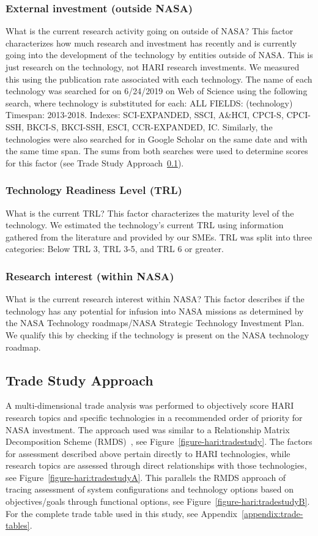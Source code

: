\subsubsection{External investment (outside NASA)}
What is the current research activity going on outside of NASA? This factor characterizes how much research and investment has recently and is currently going into the development of the technology by entities outside of NASA.
This is just research on the technology, not HARI research investments.
We measured this using the publication rate associated with each technology.
The name of each technology was searched for on 6/24/2019 on Web of Science using the following search, where technology is substituted for each:
ALL FIELDS: (technology)
Timespan: 2013-2018.
Indexes: SCI-EXPANDED, SSCI, A\&HCI, CPCI-S, CPCI-SSH, BKCI-S, BKCI-SSH, ESCI, CCR-EXPANDED, IC.
Similarly, the technologies were also searched for in Google Scholar on the same date and with the same time span.
The sums from both searches were used to determine scores for this factor (see Trade Study Approach~\ref{ss:tsapproach}).

\subsubsection{Technology Readiness Level (TRL)}
What is the current TRL? This factor characterizes the maturity level of the technology.
We estimated the technology's current TRL using information gathered from the literature and provided by our SMEs.
TRL was split into three categories: Below TRL 3, TRL 3-5, and TRL 6 or greater.

\subsubsection{Research interest (within NASA)}
What is the current research interest within NASA? This factor describes if the technology has any potential for infusion into NASA missions as determined by the NASA Technology roadmaps/NASA Strategic Technology Investment Plan.
We qualify this by checking if the technology is present on the NASA technology roadmap.

\subsection{Trade Study Approach} \label{ss:tsapproach}
A multi-dimensional trade analysis was performed to objectively score HARI research topics and specific technologies in a recommended order of priority for NASA investment.
The approach used was similar to a Relationship Matrix Decomposition Scheme (RMDS)~\citep{boppe_training}, see Figure~\ref{figure-hari:tradestudy}.
The factors for assessment described above pertain directly to HARI technologies, while research topics are assessed through direct relationships with those technologies, see Figure~\ref{figure-hari:tradestudyA}.
This parallels the RMDS approach of tracing assessment of system configurations and technology options based on objectives/goals through functional options, see Figure~\ref{figure-hari:tradestudyB}.
For the complete trade table used in this study, see Appendix~\ref{appendix:trade-tables}.

